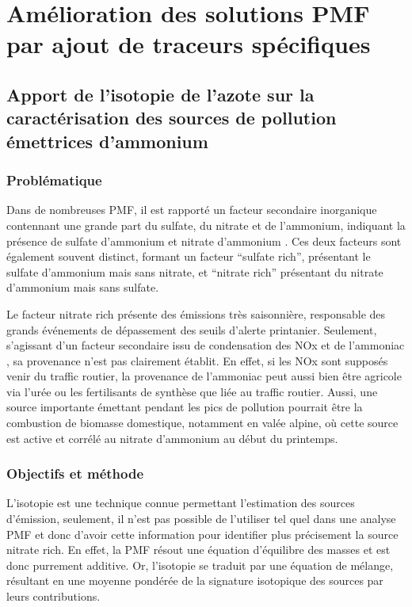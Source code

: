 \section{Amélioration des solutions PMF par ajout de traceurs spécifiques}%
\label{sec:amélioration_des_solutions_pmf}

\subsection{Apport de l'isotopie de l’azote sur la caractérisation des sources de pollution émettrices d’ammonium}%
\label{sub:isotopie}

\subsubsection{Problématique}%
\label{ssub:problématique}

Dans de nombreuses PMF, il est rapporté un facteur secondaire inorganique contennant une
grande part du sulfate, du nitrate et de l'ammonium, indiquant la présence de sulfate
d'ammonium  et nitrate d'ammonium . Ces deux facteurs sont
également souvent distinct, formant un facteur ``sulfate rich'', présentant le sulfate
d'ammonium mais sans nitrate, et ``nitrate rich'' présentant du nitrate d'ammonium mais
sans sulfate.

Le facteur nitrate rich présente des émissions très saisonnière, responsable des grands
événements de dépassement des seuils d'alerte printanier. Seulement, s'agissant d'un
facteur secondaire issu de condensation des NOx et de l'ammoniac , sa provenance
n'est pas clairement établit. En effet, si les NOx sont supposés venir du traffic routier,
la provenance de l'ammoniac peut aussi bien être agricole via l'urée ou les fertilisants de
synthèse que liée au traffic routier. Aussi, une source importante émettant pendant les
pics de pollution pourrait être la combustion de biomasse domestique, notamment en valée
alpine, où cette source est active et corrélé au nitrate d'ammonium au début du printemps.

\subsubsection{Objectifs et méthode}%
\label{ssub:objectif_et_methode}

L'isotopie est une technique connue permettant l'estimation des sources d'émission,
seulement, il n'est pas possible de l'utiliser tel quel dans une analyse PMF et donc
d'avoir cette information pour identifier plus précisement la source nitrate rich.
En effet, la PMF résout une équation d'équilibre des masses et est donc purrement
additive. Or, l'isotopie se traduit par une équation de mélange, résultant en une moyenne
pondérée de la signature isotopique des sources par leurs contributions.

